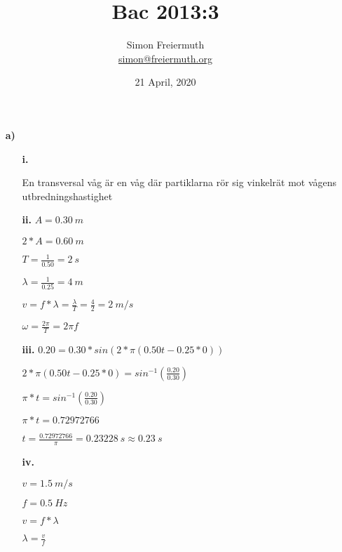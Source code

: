 \documentclass[12pt, letterpaper, twoside]{article}
\title{Bac 2013:3}
\author{Simon Freiermuth \\ \href{mailto:simon@freiermuth.org}{simon@freiermuth.org}}
\date{21 April, 2020}
\begin{document}
\maketitle

\begin{flushleft}

\begin{itemize}
\item[\textbf{a)}]


\begin{itemize}
\item[\textbf{i.}]

    En transversal våg är en våg där partiklarna rör sig vinkelrät mot vågens utbredningshastighet

    \hfill

\item[\textbf{ii.}]
    $ A = 0.30\ m $

    $ 2*A = 0.60\ m $

    $ T=\frac{1}{0.50}=2\ s $

    $ \lambda = \frac{1}{0.25}=4\ m $

    $ v=f*\lambda =\frac{\lambda}{T}=\frac{4}{2}=2\ m/s $

    $ \omega=\frac{2\pi}{T}=2\pi f $

    \hfill

\item[\textbf{iii.}]
    $ 0.20=0.30*sin(2*\pi (0.50t-0.25*0)) $

    $ 2*\pi (0.50t-0.25*0)=sin^{-1}(\frac{0.20}{0.30}) $

    $ \pi *t=sin^{-1}(\frac{0.20}{0.30}) $

    $ \pi *t=0.72972766 $

    $ t=\frac{0.72972766}{\pi}=0.23228\ s\approx0.23\ s $

    \hfill

\item[\textbf{iv.}]

    $ v = 1.5\ m/s $

    $ f = 0.5\ Hz $

    $ v = f*\lambda $

    $ \lambda = \frac{v}{f} $


\end{itemize}
\end{itemize}
\end{flushleft}
\end{document}
